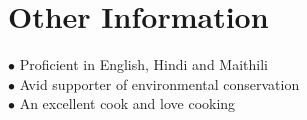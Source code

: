 \documentclass[letterpaper]{twentysecondcv} %
\begin{document}
\begin{twentyshort} %
\end{twentyshort}
\fi


\section{Other Information}

$\bullet$ Proficient in English, Hindi and Maithili\\
$\bullet$ Avid supporter of environmental conservation\\
$\bullet$ An excellent cook and love cooking\\





\end{document}

